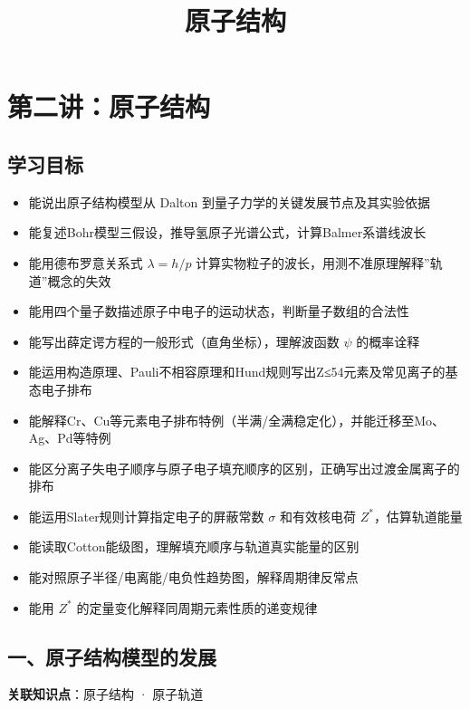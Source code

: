 \documentclass[a4paper,11pt]{ctexart}
\title{原子结构}
\date{}
\providecommand{\tightlist}{\setlength{\itemsep}{0pt}\setlength{\parskip}{0pt}}
\begin{document}
\maketitle
\tableofcontents
\newpage
\section{第二讲：原子结构}\label{ux7b2cux4e8cux8bb2ux539fux5b50ux7ed3ux6784}

\subsection{学习目标}\label{ux5b66ux4e60ux76eeux6807}

\begin{itemize}
\tightlist
\item
  能说出原子结构模型从 Dalton 到量子力学的关键发展节点及其实验依据
\item
  能复述Bohr模型三假设，推导氢原子光谱公式，计算Balmer系谱线波长
\item
  能用德布罗意关系式 \(\lambda = h/p\) 计算实物粒子的波长，用测不准原理解释''轨道''概念的失效
\item
  能用四个量子数描述原子中电子的运动状态，判断量子数组的合法性
\item
  能写出薛定谔方程的一般形式（直角坐标），理解波函数 \(\psi\) 的概率诠释
\item
  能运用构造原理、Pauli不相容原理和Hund规则写出Z≤54元素及常见离子的基态电子排布
\item
  能解释Cr、Cu等元素电子排布特例（半满/全满稳定化），并能迁移至Mo、Ag、Pd等特例
\item
  能区分离子失电子顺序与原子电子填充顺序的区别，正确写出过渡金属离子的排布
\item
  能运用Slater规则计算指定电子的屏蔽常数 \(\sigma\) 和有效核电荷 \(Z^*\)，估算轨道能量
\item
  能读取Cotton能级图，理解填充顺序与轨道真实能量的区别
\item
  能对照原子半径/电离能/电负性趋势图，解释周期律反常点
\item
  能用 \(Z^*\) 的定量变化解释同周期元素性质的递变规律
\end{itemize}

\subsection{一、原子结构模型的发展}\label{ux4e00ux539fux5b50ux7ed3ux6784ux6a21ux578bux7684ux53d1ux5c55}

\textbf{关联知识点}：原子结构 · 原子轨道
\end{document}
